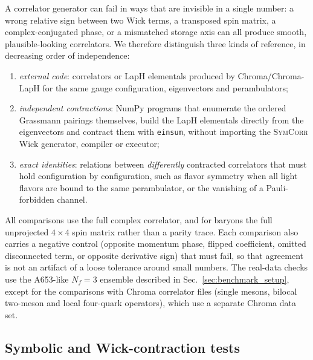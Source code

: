 \documentclass[a4paper,fleqn]{cas-dc}
\begin{document}
A correlator generator can fail in ways that are invisible in a single number:
a wrong relative sign between two Wick terms, a transposed spin matrix, a
complex-conjugated phase, or a mismatched storage axis can all produce smooth,
plausible-looking correlators. We therefore distinguish three kinds of
reference, in decreasing order of independence:
\begin{enumerate}
\item \emph{external code}: correlators or LapH elementals produced by
Chroma/Chroma-LapH for the same gauge configuration, eigenvectors and
perambulators;
\item \emph{independent contractions}: NumPy programs that enumerate the ordered
Grassmann pairings themselves, build the LapH elementals directly from the
eigenvectors and contract them with \texttt{einsum}, without importing the
\textsc{SymCorr} Wick generator, compiler or executor;
\item \emph{exact identities}: relations between \emph{differently} contracted
correlators that must hold configuration by configuration, such as flavor
symmetry when all light flavors are bound to the same perambulator, or the
vanishing of a Pauli-forbidden channel.
\end{enumerate}
All comparisons use the full complex correlator, and for baryons the full
unprojected \(4\times4\) spin matrix rather than a parity trace. Each comparison
also carries a negative control (opposite momentum phase, flipped coefficient,
omitted disconnected term, or opposite derivative sign) that must fail, so that
agreement is not an artifact of a loose tolerance around small numbers. The
real-data checks use the A653-like \(N_f=3\) ensemble described in
Sec.~\ref{sec:benchmark_setup}, except for the comparisons with Chroma correlator
files (single mesons, bilocal two-meson and local four-quark operators), which use
a separate Chroma data set.

\subsection{Symbolic and Wick-contraction tests}
\label{sec:validation_symbolic}
\end{document}
